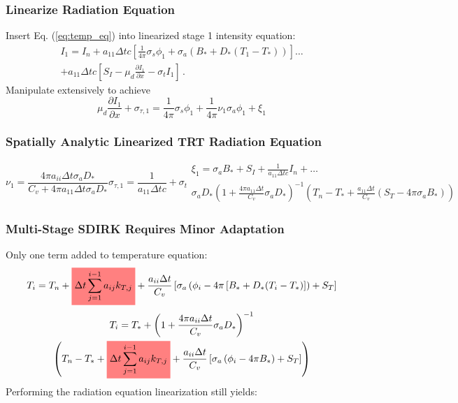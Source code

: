 \documentclass{beamer}
\newcommand{\highlight}[1]{%
  \colorbox{red!50}{$\displaystyle#1$}}
\newcommand{\be}{\begin{equation*}}   %
\newcommand{\ee}{\end{equation*}}
\newcommand{\benum}{\begin{equation}}   %
\newcommand{\eenum}{\end{equation}}
\newcommand{\eqt}[1]{Eq. (\ref{#1})}  %
\newcommand{\pep}{\, .}
\begin{document}
\begin{frame}
\frametitle{Linearize Radiation Equation}
Insert \eqt{eq:temp_eq} into linearized stage 1 intensity equation:
\begin{multline*}
I_1 = I_n + a_{11} \Delta t c \left[ \frac{1}{4\pi}\sigma_{s} \phi_1 + \sigma_a \left(B_* + D_*(T_1 - T_*)  \right) \right]\dots \\ 
+ a_{11} \Delta t c\left[ S_I - \mu_d \frac{\partial I_1}{\partial x} - \sigma_t I_1 \right] \pep
\end{multline*}
Manipulate  extensively to achieve
\benum
\mu_d \frac{\partial I_1}{\partial x} + \sigma_{\tau,1} = \frac{1}{4\pi} \sigma_s \phi_1 + \frac{1}{4\pi}\nu_1 \sigma_a \phi_1 + \xi_1 
\label{eq:analytic_pseudo_i}
\eenum
\end{frame}

\begin{frame}
\frametitle{Spatially Analytic Linearized TRT Radiation Equation}
\begin{subequations}
\benum
\nu_1 = \frac{ 4\pi a_{ii} \Delta t \sigma_a D_*}{C_v + 4\pi a_{11} \Delta t  \sigma_a D_*} 
\label{eq:analytic_nu}
\eenum
\benum
\sigma_{\tau,1} = \frac{1}{a_{11} \Delta t c} + \sigma_t 
\label{eq:tau_i_analytic}
\eenum
\begin{multline}
\xi_1 = \sigma_a B_* + S_I +  \frac{1}{a_{11} \Delta t c} I_n  + \dots  \\ 
\sigma_a D_*\left(1 + \frac{4\pi a_{11} \Delta t}{C_v} \sigma_a D_*  \right)^{-1} 
\left( T_n - T_* +  \frac{a_{11} \Delta t }{C_v}  \left( S_T -  4\pi  \sigma_a B_*   \right) \right) 
\end{multline}
\end{subequations}
\end{frame}

\begin{frame}
\frametitle{Multi-Stage SDIRK Requires Minor Adaptation}
Only one term added to temperature equation:
\be
T_i = T_n + \highlight{ \Delta t \sum_{j=1}^{i-1}{a_{ij} k_{T,j}} } + \frac{a_{ii} \Delta t }{C_v} \left[ \sigma_a \left( \phi_i - 4\pi \left[ B_* + D_*(T_i - T_*) \right] \right) + S_T  \right] 
\ee
\begin{multline*}
T_i = T_* + \left(1 + \frac{4\pi a_{ii} \Delta t}{C_v} \sigma_a D_*  \right)^{-1} \\
\left( T_n - T_* + \highlight{ \Delta t \sum_{j=1}^{i-1}{a_{ij} k_{T,j}} } +  \frac{a_{ii} \Delta t }{C_v} \left[ \sigma_a \left( \phi_i - 4\pi   B_* \right) + S_T \right]  \right)
\end{multline*}
Performing the radiation equation linearization still yields:
\end{frame}
\end{document}
